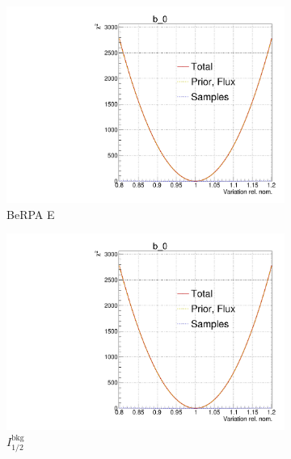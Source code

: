 \begin{figure}[h]
	\begin{subfigure}[t]{0.32\textwidth}
		\includegraphics[width=\textwidth,page=116, trim={0mm 0mm 0mm 11mm}, clip]{figures/mach3/2018/llh/tryBinningNumber6_after_fit_asimov_asimov_ND280logL_scan}
		\caption{BeRPA E}
	\end{subfigure}
	\begin{subfigure}[t]{0.32\textwidth}
		\includegraphics[width=\textwidth,page=120, trim={0mm 0mm 0mm 11mm}, clip]{figures/mach3/2018/llh/tryBinningNumber6_after_fit_asimov_asimov_ND280logL_scan}
		\caption{$I_{1/2}^\text{bkg}$}
	\end{subfigure}
	\begin{subfigure}[t]{0.32\textwidth}

\end{subfigure}
\end{figure}
